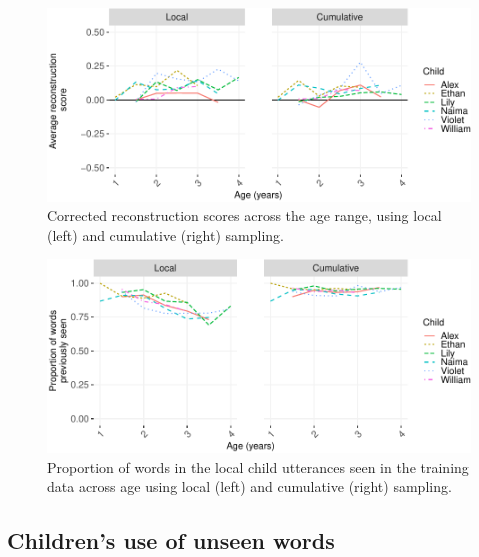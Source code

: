 \documentclass[man,mask,floatsintext]{apa6}
\begin{document}
\begin{figure}
\includegraphics[width=0.95\linewidth]{CBL-age_invariance_files/figure-latex/fig6-1} \caption{Corrected reconstruction scores across the age range, using local (left) and cumulative (right) sampling.}\label{fig:fig6}
\end{figure}

\begin{figure}
\includegraphics[width=0.95\linewidth]{CBL-age_invariance_files/figure-latex/fig7-1} \caption{Proportion of words in the local child utterances seen in the training data across age using local (left) and cumulative (right) sampling.}\label{fig:fig7}
\end{figure}

\subsection{Children's use of unseen
words}\label{childrens-use-of-unseen-words}
\end{document}
